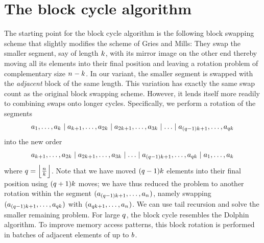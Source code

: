   \section{The block cycle algorithm}\label{sec.algorithm}
  The starting point for the block cycle algorithm is the following
  block swapping scheme that slightly modifies the scheme of Gries and
  Mills: They swap the smaller segment, say of length $k_{}$, with its
  mirror image on the other end thereby moving all its elements into
  their final position and leaving a rotation problem of complementary
  size $n_{}-k_{}$. In our variant, the smaller segment is swapped
  with the \emph{adjacent} block of the same length. %
  This variation has exactly the same swap count as the original block
  swapping scheme. However, it lends itself more readily to combining
  swaps onto longer cycles. Specifically, we perform a rotation of the
  segments
  \[
    a_{1},\ldots,a_{k_{}}\mid
    a_{k_{}+1},\ldots,a_{2k_{}}\mid
    a_{2k_{}+1},\ldots,a_{3k_{}}\mid
    \ldots
    \mid a_{(q-1)k_{}+1},\ldots,a_{qk_{}}
  \]
  into the new order
  \[
    a_{k_{}+1},\ldots,a_{2k_{}}\mid
    a_{2k_{}+1},\ldots,a_{3k_{}}\mid
    \ldots
    \mid a_{(q-1)k_{}+1},\ldots,a_{qk_{}}
    \mid a_{1},\ldots,a_{k_{}}
  \]  
  where $\Blocks=\FloorOf{\frac{\Size}{\Shift}}$.  Note that we
  have moved $(q-1)k_{}$ elements into their final position
  using $(q+1)k_{}$ moves;  we have thus reduced the problem
  to another rotation within the segment
  $(a_{(q-1)k_{}+1},\ldots,a_{n_{}})$, namely
  swapping
  $(a_{(q-1)k_{}+1},\ldots,a_{qk_{}})$ with
  $(a_{qk_{}+1},\ldots,a_{n_{}})$. We can use tail
  recursion and solve the smaller remaining problem.  For large $q$, the block cycle resembles the Dolphin algorithm. To
  improve memory access patterns, this block rotation is performed in
  batches of adjacent elements of up to $b$.
  
